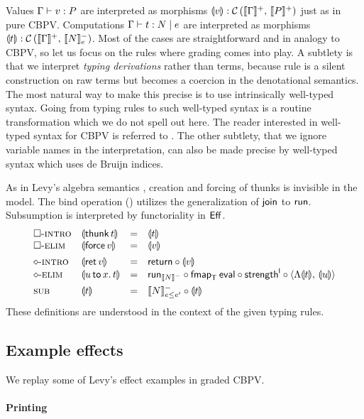 \documentclass[acmsmall,review,anonymous]{acmart}\settopmatter{printfolios=true,printccs=false,printacmref=false}
\newcommand{\graybox}[1]{\grayboxtext{$#1$}}
\theoremstyle{remark}
\begin{document}
Values $\ValTy \Gamma v P$ are interpreted as morphisms $\dent v :
\Hom {\denp \Gamma} {\denp P}$ just as in pure CBPV.  Computations
$\CompTy \Gamma t e N$ are interpreted as morphisms $\dent t : \Hom
{\denp \Gamma} {\Denn N e}$.  Most of the cases are straightforward
and in analogy to CBPV, so let us focus on the
\graybox{\mbox{modified}} rules where grading comes into play.  A
subtlety is that we interpret \emph{typing derivations} rather than terms,
because rule \rsub is a silent construction on raw terms but becomes a
coercion in the denotational semantics.  The most natural way to make
this precise is to use intrinsically well-typed syntax.  Going from typing
rules to such well-typed syntax is a routine transformation which we
do not spell out here.  The reader interested in well-typed syntax for
CBPV is referred to \citet{abelSattler:ppdp19}.
The other subtlety, that we ignore variable names in the
interpretation, can also be made precise by well-typed syntax which
uses de Bruijn indices.

As in Levy's algebra semantics \citeyearpar{levy:hosc06}, creation and
forcing of thunks is invisible in the model.  The bind operation
(\relim\diamond) utilizes the generalization of $\tjoin$ to $\trun$.
Subsumption is interpreted by functoriality in $\Eff$.
\[
\begin{array}{llcl}
\rintro\Box & \dent{\thunk t} & = & \dent t \\
\relim\Box  & \dent{\force v} & = & \dent v
\\[1ex]
\rintro\diamond & \dent{\ret v} & = & \treturn \comp \dent v \\
\relim\diamond  & \dent{\bind x u t} & = &
  \run[\denn N] \comp \fmap[\T]\teval \comp \strengthl \comp
  \langle \Lambda\dent t,\,\dent u \rangle
\\[1ex]
\rsub & \dent t & = & \Denn N {e \leq e'} \comp \dent t
\\
\end{array}
\]
These definitions are understood in the context of the given typing rules.


\subsection{Example effects}

We replay some of Levy's \citeyearpar{levy:hosc06} effect examples in
graded CBPV.

\paragraph{Printing}
\end{document}

